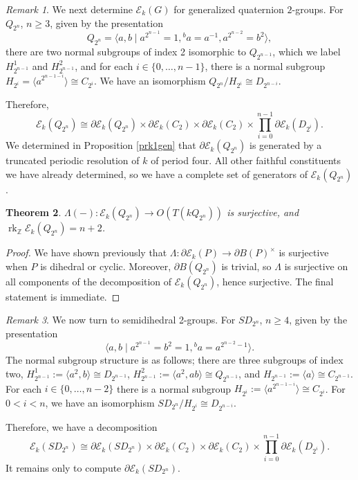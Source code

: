 \documentclass[10pt,letterpaper, boxed, cm]{amsart}
\newcommand{\Z}{\mathbb{Z}}
\newcommand{\rk}{\operatorname{rk}}
\newcommand{\inv}{^{-1}}
\newcommand{\calE}{\mathcal{E}}
\newtheorem{theorem}{Theorem}[section]
\theoremstyle{remark}
\newtheorem{remark}[theorem]{Remark}
\theoremstyle{definition}
\begin{document}
	\begin{remark}
		We next determine $\calE_k(G)$ for generalized quaternion $2$-groups. For $Q_{2^n}$, $n \geq 3$, given by the presentation \[Q_{2^n} = \langle a,b \mid a^{2^{n-1}} = 1, {}^ba = a\inv, a^{2^{n-2}} = b^2\rangle,\] there are two normal subgroups of index 2 isomorphic to $Q_{2^{n-1}}$, which we label $H_{2^{n-1}}^1$ and $H_{2^{n-1}}^2$, and for each $i \in \{0, \dots, n-1\}$, there is a normal subgroup $H_{2^i} = \langle a^{2^{n-1-i}} \rangle\cong C_{2^i} $. We have an isomorphism $Q_{2^n}/H_{2^i}\cong D_{2^{n-i}} $.

		Therefore, \[\calE_k(Q_{2^n}) \cong \partial\calE_k(Q_{2^n}) \times \partial\calE_k(C_2)\times \partial\calE_k(C_2) \times \prod_{i=0}^{n - 1} \partial\calE_k(D_{2^i}).\] We determined in Proposition \ref{prk1gen} that $\partial\calE_k(Q_{2^n})$ is generated by a truncated periodic resolution of $k$ of period four. All other faithful constituents we have already determined, so we have a complete set of generators of $\calE_k(Q_{2^n})$.
	\end{remark}

	\begin{theorem}
		$\Lambda(-): \calE_k(Q_{2^n}) \to O(T(kQ_{2^n}))$ is surjective, and $\rk_\Z \calE_k(Q_{2^n}) = n+2$.
	\end{theorem}
	\begin{proof}
		We have shown previously that $\Lambda: \partial\calE_k(P)\to \partial B(P)^\times$ is surjective when $P$ is dihedral or cyclic. Moreover, $\partial B(Q_{2^n})$ is trivial, so $\Lambda$ is surjective on all components of the decomposition of $\calE_k(Q_{2^n})$, hence surjective. The final statement is immediate.
	\end{proof}

	\begin{remark}
		We now turn to semidihedral 2-groups. For $SD_{2^n}$, $n\geq 4$, given by the presentation \[\langle a,b \mid a^{2^{n-1}} = b^2 = 1, {}^ba = a^{2^{n-2}-1}\rangle.\] The normal subgroup structure is as follows; there are three subgroups of index two, $H_{2^{n-1}}^1 := \langle a^2, b\rangle \cong D_{2^{n-1}}$, $H_{2^{n-1}}^2 := \langle a^2, ab\rangle \cong Q_{2^{n-1}}$, and $H_{2^{n-1}} := \langle a \rangle \cong C_{2^{n-1}}$. For each $i \in \{0, \dots, n-2\}$ there is a normal subgroup $H_{2^i} := \langle a^{2^{n-1-i}} \rangle \cong C_{2^i}$. For $0 < i < n $, we have an isomorphism $SD_{2^n}/H_{2^i} \cong D_{2^{n-i}}$.

		Therefore, we have a decomposition \[\calE_{k}(SD_{2^n}) \cong \partial\calE_k(SD_{2^n})\times \partial\calE_k(C_2)\times \partial\calE_k(C_2) \times \prod_{i=0}^{n - 1} \partial\calE_k(D_{2^i}). \] It remains only to compute $\partial\calE_{k}(SD_{2^n})$.
    \end{remark}
\end{document}

